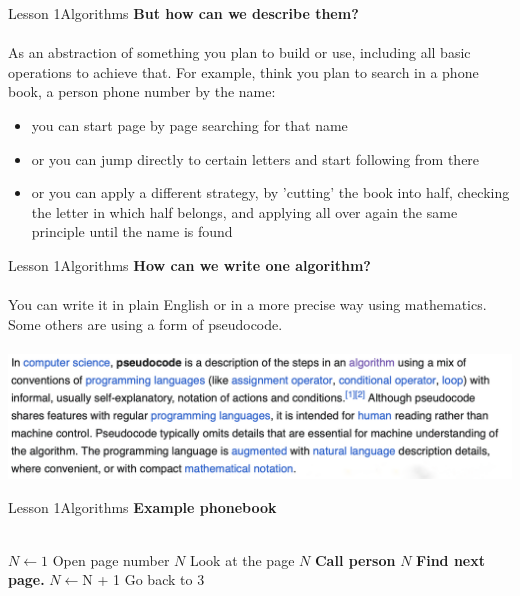 \documentclass[aspectratio=1610]{beamer}
\begin{document}
\begin{frame}{Lesson 1}{Algorithms}
\Large
\textbf{But how can we describe them?}\\~\\ 
As an abstraction of something you plan to build or use, including all basic operations to achieve that. For example, think you plan to search in a phone book, a person phone number by the name:
\begin{itemize}
    \item you can start page by page searching for that name
    \item or you can jump directly to certain letters and start following from there
    \item or you can apply a different strategy, by 'cutting' the book into half, checking the letter in which half belongs, and applying all over again the same principle until the name is found
\end{itemize}
\end{frame}


\begin{frame}{Lesson 1}{Algorithms}
\Large
\textbf{How can we write one algorithm?}\\~\\ 
You can write it in plain English or in a more precise way using mathematics. Some others are using a form of \alert{pseudocode}.\\~\\
\includegraphics[scale=0.27]{Images/pseudocode}

\end{frame}


\begin{frame}{Lesson 1}{Algorithms}
\Large
\textbf{Example phonebook}\\~\\

\label{phonebook}

\begin{algorithmic}[1]

\State $N\gets 1$
\State Open page number $N$
\State Look at the page $N$
    \State \textbf{Call person} $N$
\Else \State \textbf{Find next page.} {$N\gets $N + 1} Go back to 3 
\EndIf
\EndProcedure
\end{algorithmic}
\end{frame}
\end{document}
